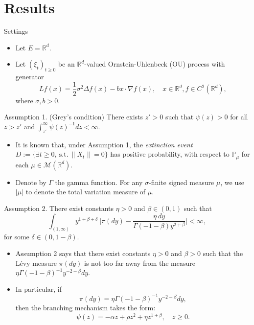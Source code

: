\documentclass[9pt]{beamer}
\begin{document}
\section{Results}
\begin{frame}[allowframebreaks]{Settings}
\begin{itemize}
\item
	Let $E= \mathbb R^d$.
\item
	Let $(\xi_t)_{t\geq 0}$ be an $\mathbb R^d$-valued Ornstein-Uhlenbeck (OU) process with generator
\[
	Lf(x)
	=\frac{1}{2} \sigma^2 \Delta f(x)-bx\cdot\nabla f(x),
	\quad x\in \mathbb R^d, f\in C^2(\mathbb R^d),
\]
	where $\sigma,b>0$.
\end{itemize}
\begin{block}{Assumption 1. (Grey's condition)}
	There exists $z' > 0$ such that $\psi(z) > 0$ for all $z>z'$ and  $\int_{z'}^\infty \psi(z)^{-1}dz < \infty$.
\end{block}
\begin{itemize}
\item
	It is known  that, under Assumption 1, 
	the \emph{extinction event} 
	$D:=\{\exists t\geq 0,~\text{s.t.}~\|X_t\|=0\}$ has positive probability, with respect to $\mathbb P_\mu$ for each  $\mu \in \mathcal M(\mathbb R^d)$.
\item
	Denote by $\Gamma$ the gamma function.
	For any $\sigma$-finite signed measure $\mu$, we use $|\mu|$ to denote the total variation measure of $\mu$.
\end{itemize}
\begin{block}{Assumption 2.}
	There exist constants $\eta > 0$ and $\beta \in (0,1)$ such that
\begin{equation}
    \int_{(1,\infty)}y^{1+\beta +\delta}~\Big|\pi(dy)-\frac{\eta~dy}{\Gamma(-1-\beta)y^{2+\beta}}\Big| <\infty,
\end{equation}
	for some $\delta \in (0,1-\beta)$.
\end{block}
\begin{itemize}
\item
	Assumption 2 says that 
 there exist constants $\eta>0$ and $\beta > 0$ 
    such that the L\'evy measure $\pi(dy)$ is not too far away from the measure $\eta \Gamma(-1-\beta)^{-1}y^{-2-\beta} dy$.
\item
    In particular, if \[\pi(dy)=\eta \Gamma(-1-\beta)^{-1}y^{-2-\beta} dy,\] then the branching mechanism takes the form: \[\psi(z)=-\alpha z + \rho z^2 + \eta z^{1+\beta},\quad z\geq 0.\]
\end{itemize}
\begin{lemma}

\end{lemma}
\end{frame}
\end{document}
